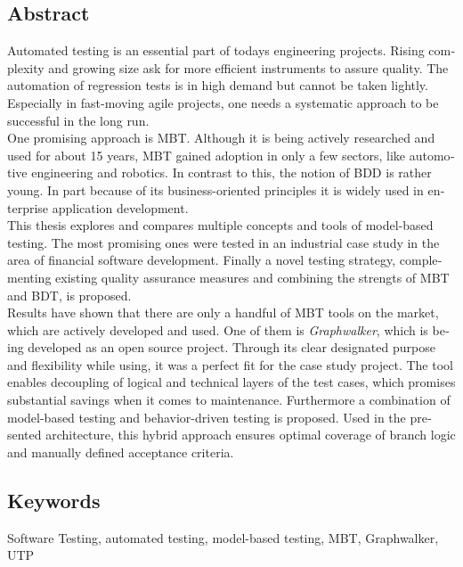 \glsresetall
\begin{otherlanguage}{english}

  \chapter*{Abstract}

  Automated testing is an essential part of todays engineering projects. Rising complexity and growing size ask for more efficient instruments to assure quality. The automation of regression tests is in high demand but cannot be taken lightly. Especially in fast-moving agile projects, one needs a systematic approach to be successful in the long run.\\

  One promising approach is \Gls{MBT}. Although it is being actively researched and used for about 15 years, \Gls{MBT} gained adoption in only a few sectors, like automotive engineering and robotics. In contrast to this, the notion of \Gls{BDD} is rather young. In part because of its business-oriented principles it is widely used in enterprise application development.\\

  This thesis explores and compares multiple concepts and tools of model-based testing. The most promising ones were tested in an industrial case study in the area of financial software development. Finally a novel testing strategy, complementing existing quality assurance measures and combining the strengts of \Gls{MBT} and \Gls{BDT}, is proposed.\\

  Results have shown that there are only a handful of \Gls{MBT} tools on the market, which are actively developed and used. One of them is \textit{Graphwalker}, which is being developed as an open source project. Through its clear designated purpose and flexibility while using, it was a perfect fit for the case study project. The tool enables decoupling of logical and technical layers of the test cases, which promises substantial savings when it comes to maintenance. Furthermore a combination of model-based testing and behavior-driven testing is proposed. Used in the presented architecture, this hybrid approach ensures optimal coverage of branch logic and manually defined acceptance criteria.

  \bigskip

  \section*{Keywords}
  Software Testing, automated testing, model-based testing, MBT, Graphwalker, UTP

\end{otherlanguage}






















